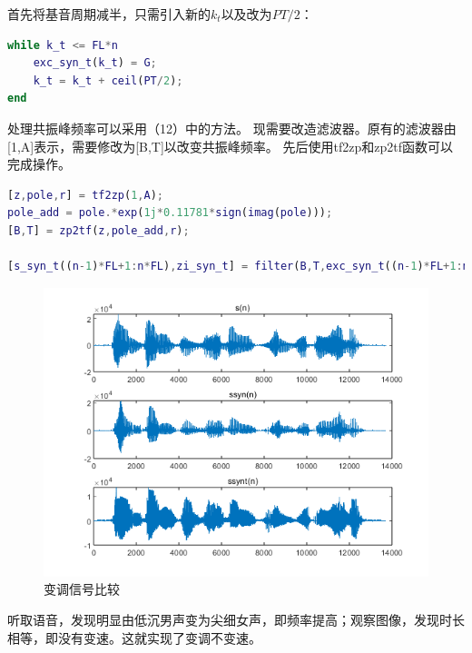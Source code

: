 \documentclass[10pt]{article}
\begin{document}
首先将基音周期减半，只需引入新的$k_t$以及改为$PT/2$：
\begin{lstlisting}[language=matlab]
while k_t <= FL*n
    exc_syn_t(k_t) = G;
    k_t = k_t + ceil(PT/2);
end
\end{lstlisting}

处理共振峰频率可以采用（12）中的方法。
现需要改造滤波器。原有的滤波器由[1,A]表示，需要修改为[B,T]以改变共振峰频率。
先后使用tf2zp和zp2tf函数可以完成操作。
\begin{lstlisting}[language=matlab]
[z,pole,r] = tf2zp(1,A);
pole_add = pole.*exp(1j*0.11781*sign(imag(pole)));
[B,T] = zp2tf(z,pole_add,r);

[s_syn_t((n-1)*FL+1:n*FL),zi_syn_t] = filter(B,T,exc_syn_t((n-1)*FL+1:n*FL),zi_syn_t);
\end{lstlisting}
\begin{figure}[h]
	\centering
	\begin{minipage}{0.49\linewidth}
		\centering
		\includegraphics[width=1\linewidth]{drawing2-13.png}
		\caption{变调信号比较}
	\end{minipage}
\end{figure}
听取语音，发现明显由低沉男声变为尖细女声，即频率提高；观察图像，发现时长
相等，即没有变速。这就实现了变调不变速。
\end{document}
